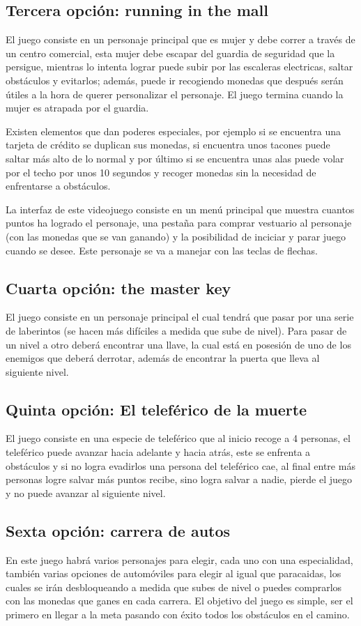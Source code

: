 \documentclass{article}
\begin{document}
\subsection{Tercera opción: running in the mall}
El juego consiste en un personaje principal que es mujer y debe correr a través de un centro comercial, esta mujer debe escapar del guardia de seguridad que la persigue, mientras lo intenta lograr puede subir por las escaleras electricas, saltar obstáculos y evitarlos; además, puede ir recogiendo monedas que después serán útiles a la hora de querer personalizar el personaje. El juego termina cuando la mujer es atrapada por el guardia.
\vspace{0.2 cm}

Existen elementos que dan poderes especiales, por ejemplo si se encuentra una tarjeta de crédito se duplican sus monedas, si encuentra unos tacones puede saltar más alto de lo normal y por último si se encuentra unas alas puede volar por el techo por unos 10 segundos y recoger monedas sin la necesidad de enfrentarse a obstáculos. 
\vspace{0.2 cm}

La interfaz de este videojuego consiste en un menú principal que muestra cuantos puntos ha logrado el personaje, una pestaña para comprar vestuario al personaje (con las monedas que se van ganando) y la posibilidad de inciciar y parar juego cuando se desee. Este personaje se va a manejar con las teclas de flechas.

\subsection{Cuarta opción: the master key}
El juego consiste en un personaje principal el cual tendrá que pasar por una serie de laberintos (se hacen más difíciles a medida que sube de nivel). Para pasar de un nivel a otro deberá encontrar una llave, la cual está en posesión de uno de los enemigos que deberá derrotar, además de encontrar la puerta que lleva al siguiente nivel.
\vspace{0.2 cm}


\subsection{Quinta opción: El teleférico de la muerte}
El juego consiste en una especie de teleférico que al inicio recoge a 4 personas, el teleférico puede avanzar hacia adelante y hacia atrás, este se enfrenta a obstáculos y si no logra evadirlos una persona del teleférico cae, al final entre más personas logre salvar más puntos recibe, sino logra salvar a nadie, pierde el juego y no puede avanzar al siguiente nivel.

\subsection{Sexta opción: carrera de autos}
En este juego habrá varios personajes para elegir, cada uno con una especialidad, también varias opciones de automóviles para elegir al igual que paracaidas, los cuales se irán desbloqueando a medida que subes de nivel o puedes comprarlos con las monedas que ganes en cada carrera. El objetivo del juego es simple, ser el primero en llegar a la meta pasando con éxito todos los obstáculos en el camino.
\end{document}
